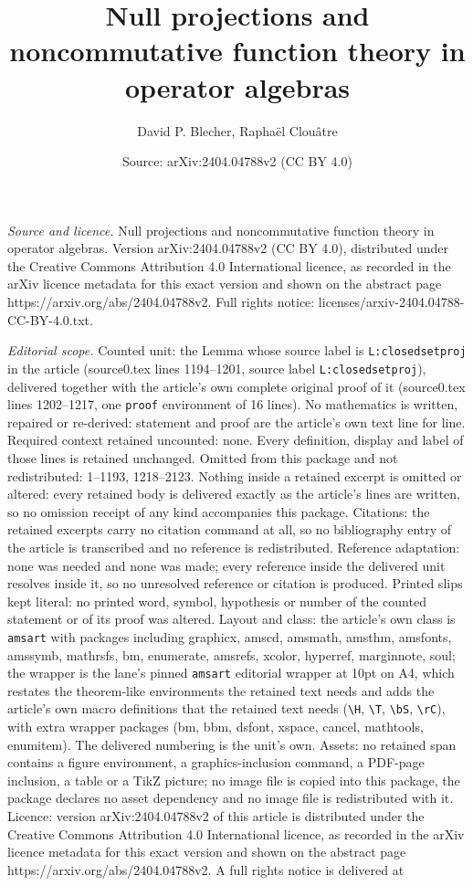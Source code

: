 \documentclass[10pt,a4paper]{amsart}
\title[Null projections and noncommutative function theory in opera]{Null projections and noncommutative function theory in operator algebras}
\author{David P. Blecher, Rapha\"el Clou\^atre}
\date{Source: arXiv:2404.04788v2 (CC BY 4.0)}
\begin{document}
\maketitle

\noindent\emph{Source and licence.} Null projections and noncommutative function theory in operator algebras. Version arXiv:2404.04788v2 (CC BY 4.0), distributed under the Creative Commons Attribution 4.0 International licence, as recorded in the arXiv licence metadata for this exact version and shown on the abstract page https://arxiv.org/abs/2404.04788v2. Full rights notice: licenses/arxiv-2404.04788-CC-BY-4.0.txt.\par\smallskip

\noindent\textit{Editorial scope.} Counted unit: the Lemma whose source label is \texttt{L:closedsetproj} in the article (source0.tex lines 1194--1201, source label \texttt{L:closedsetproj}), delivered together with the article's own complete original proof of it (source0.tex lines 1202--1217, one \texttt{proof} environment of 16 lines). No mathematics is written, repaired or re-derived: statement and proof are the article's own text line for line. Required context retained uncounted: none. Every definition, display and label of those lines is retained unchanged. Omitted from this package and not redistributed: 1--1193, 1218--2123. Nothing inside a retained excerpt is omitted or altered: every retained body is delivered exactly as the article's lines are written, so no omission receipt of any kind accompanies this package. Citations: the retained excerpts carry no citation command at all, so no bibliography entry of the article is transcribed and no reference is redistributed. Reference adaptation: none was needed and none was made; every reference inside the delivered unit resolves inside it, so no unresolved reference or citation is produced. Printed slips kept literal: no printed word, symbol, hypothesis or number of the counted statement or of its proof was altered. Layout and class: the article's own class is \texttt{amsart} with packages including graphicx, amscd, amsmath, amsthm, amsfonts, amssymb, mathrsfs, bm, enumerate, amsrefs, xcolor, hyperref, marginnote, soul; the wrapper is the lane's pinned \texttt{amsart} editorial wrapper at 10pt on A4, which restates the theorem-like environments the retained text needs and adds the article's own macro definitions that the retained text needs (\texttt{\textbackslash H}, \texttt{\textbackslash T}, \texttt{\textbackslash bS}, \texttt{\textbackslash rC}), with extra wrapper packages (bm, bbm, dsfont, xspace, cancel, mathtools, enumitem). The delivered numbering is the unit's own. Assets: no retained span contains a figure environment, a graphics-inclusion command, a PDF-page inclusion, a table or a TikZ picture; no image file is copied into this package, the package declares no asset dependency and no image file is redistributed with it. Licence: version arXiv:2404.04788v2 of this article is distributed under the Creative Commons Attribution 4.0 International licence, as recorded in the arXiv licence metadata for this exact version and shown on the abstract page https://arxiv.org/abs/2404.04788v2. A full rights notice is delivered at 
\end{document}
